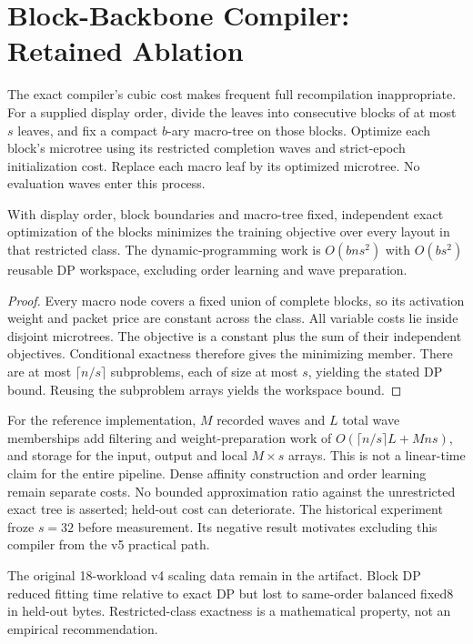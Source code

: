 \section{Block-Backbone Compiler: Retained Ablation}\label{sec:block}
The exact compiler's cubic cost makes frequent full recompilation inappropriate. For a supplied display order, divide the leaves into consecutive blocks of at most $s$ leaves, and fix a compact $b$-ary macro-tree on those blocks. Optimize each block's microtree using its restricted completion waves and strict-epoch initialization cost. Replace each macro leaf by its optimized microtree. No evaluation waves enter this process.

\begin{proposition}\label{prop:block}
With display order, block boundaries and macro-tree fixed, independent exact optimization of the blocks minimizes the training objective over every layout in that restricted class. The dynamic-programming work is $O(bns^2)$ with $O(bs^2)$ reusable DP workspace, excluding order learning and wave preparation.
\end{proposition}
\begin{proof}
Every macro node covers a fixed union of complete blocks, so its activation weight and packet price are constant across the class. All variable costs lie inside disjoint microtrees. The objective is a constant plus the sum of their independent objectives. Conditional exactness therefore gives the minimizing member. There are at most $\lceil n/s\rceil$ subproblems, each of size at most $s$, yielding the stated DP bound. Reusing the subproblem arrays yields the workspace bound.\end{proof}
For the reference implementation, $M$ recorded waves and $L$ total wave memberships add filtering and weight-preparation work of $O(\lceil n/s\rceil L+Mns)$, and storage for the input, output and local $M\times s$ arrays. This is not a linear-time claim for the entire pipeline. Dense affinity construction and order learning remain separate costs. No bounded approximation ratio against the unrestricted exact tree is asserted; held-out cost can deteriorate. The historical experiment froze $s=32$ before measurement. Its negative result motivates excluding this compiler from the v5 practical path.


The original 18-workload v4 scaling data remain in the artifact. Block DP reduced fitting time relative to exact DP but lost to same-order balanced fixed8 in held-out bytes. Restricted-class exactness is a mathematical property, not an empirical recommendation.
